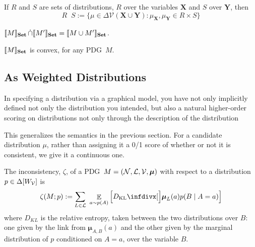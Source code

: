 \documentclass{article}
\newcommand\changeon{\color{note-fg} }
\newcommand\changeoff{\color{black} }
\newcommand\Set{\textbf{Set}}
\newcommand\bmu{\boldsymbol{\mu}}
\newcommand{\MN}{PDG}
\DeclareMathOperator\dcap{\mathop{\dot\cap}}
\begin{document}
	
	If $R$ and $S$ are sets of distributions, $R$ over the variables $\mathbf X$ and $S$ over $\mathbf Y$, then
	$$R \dcap S := \{ \mu \in  \Delta \mathcal V(\mathbf X \cup \mathbf Y) : \mu_{\mathbf X}, \mu_{\mathbf Y} \in R \times S \}  $$
	\begin{prop}
		$\bbr{M}_\Set \dcap \bbr{M'}_\Set = \bbr{M \cup M'}_\Set$.
	\end{prop}

	\changeoff
	
	\begin{lemma}[restate=thmsetconvex] 
		\label{prop:convex}
		$\bbr{M}_\Set$ is convex, for any \MN\ $M$.
	\end{lemma}%






	\subsection{As Weighted Distributions}
	\changeon
	
	
	In specifying a distribution via a graphical model, you have not only implicitly defined not only the distribution you intended, but also a natural higher-order scoring on distributions not only through the description of the distribution 
	
 	This generalizes the semantics in the previous section. For a candidate distribution $\mu$, rather than assigning it a 0/1 score of whether or not it is consistent, we give it a continuous one.

	\begin{defn}
		The inconsistency, $\zeta$, of a \MN\ $M = (\cal N, L, V, \bmu)$ with respect to a distribution $p \in \Delta[W_{\cal V}]$ is
		\[
			\zeta(M ; p) := %
			\sum_{L \in \cal L}~\mathop{\mathbb E}_{a \sim p(A)} \left[\kldiv[\Big]{\bmu_{L}(a) }{ p(B \mid A = a) } \right]
		\]
		where $D_{KL}$ is the relative entropy, taken between the two distributions over $B$: one given by the link from $\bmu_{A,B}(a)$ and the other given by the marginal distribution of $p$ conditioned on $A = a$, over the variable $B$.
	\end{defn}	
	
\end{document}
